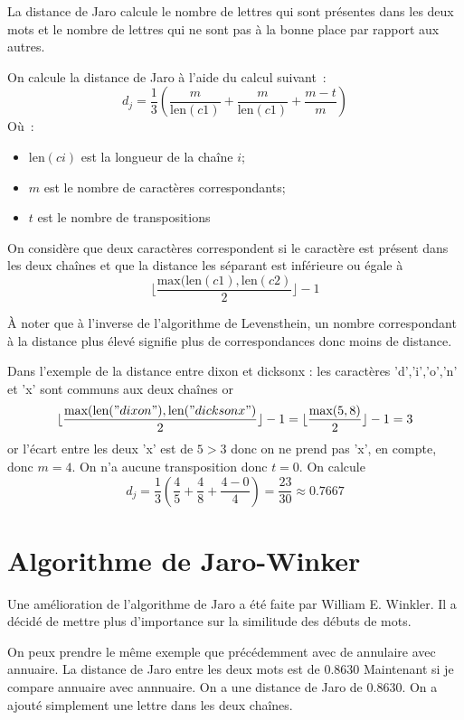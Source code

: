 \documentclass[final, 10pt]{report}
\begin{document}
    La distance de Jaro calcule le nombre de lettres qui sont présentes dans les deux mots et le nombre de lettres qui ne sont pas à la bonne place par rapport aux autres.
    
    On calcule la distance de Jaro à l'aide du calcul suivant~: 
    $$d_j = \frac{1}{3}\left(\frac{m}{\text{len}(c1)}+\frac{m}{\text{len}(c1)}+\frac{m-t}{m}\right)$$
    Où~:
    \begin{itemize}
        \item $\text{len}(ci)$ est la longueur de la chaîne $i$;
        \item $m$ est le nombre de caractères correspondants;
        \item $t$ est le nombre de transpositions
    \end{itemize}

    \medskip
    On considère que deux caractères correspondent si le caractère est présent dans les deux chaînes et que la distance les séparant est inférieure ou égale à $$\lfloor\frac{\text{max}(\text{len}(c1), \text{len}(c2)}{2}\rfloor -1$$
    
    À noter que à l'inverse de l'algorithme de Levensthein, un nombre correspondant à la distance plus élevé signifie plus de correspondances donc moins de distance.
    
    Dans l'exemple de la distance entre \og dixon\fg{} et \og dicksonx\fg{} : les caractères 'd','i','o','n' et 'x' sont communs aux deux chaînes or $$\lfloor\frac{\text{max}(\text{len}("dixon"), \text{len}("dicksonx")}{2}\rfloor -1 = \lfloor\frac{\text{max}(5,8)}{2}\rfloor -1 = 3$$
    or l'écart entre les deux 'x' est de $5 > 3$ donc on ne prend pas 'x', en compte, donc $m = 4$. On n'a aucune transposition donc $t = 0$. On calcule $$d_j = \frac{1}{3}\left(\frac{4}{5}+\frac{4}{8}+\frac{4-0}{4}\right) = \frac{23}{30} \approx 0.7667$$
    
\section{Algorithme de Jaro-Winker\cite{noauthor_distance_2021}}

    Une amélioration de l'algorithme de Jaro a été faite par William E. Winkler.
    Il a décidé de mettre plus d'importance sur la similitude des débuts de mots.
    
    On peux prendre le même exemple que précédemment avec de \og annulaire\fg{} avec \og annuaire\fg{}. 
    La distance de Jaro entre les deux mots est de $0.8630$
    Maintenant si je compare  \fg annuaire\og{} avec \fg annnuaire\og{}.
    On a une distance de Jaro de $0.8630$.
    On a ajouté simplement une lettre dans les deux chaînes.
    
\end{document}
